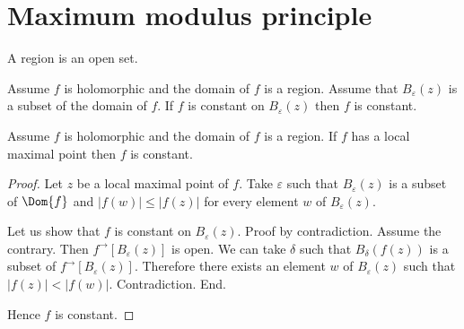 \documentclass{article}
\newcommand{\Ball}[2]{B_{#1}(#2)}
\newcommand{\image}[2]{#1^{\to}[#2]}
\begin{document}
    \section{Maximum modulus principle}

  \begin{forthel}
    \begin{signature}
      A region is an open set.
    \end{signature}

    \begin{axiom}
      Assume $f$ is holomorphic and the domain of $f$ is a region.
      Assume that $\Ball{\varepsilon}{z}$ is a subset of the domain of $f$.
      If $f$ is constant on $\Ball{\varepsilon}{z}$ then $f$ is constant.
    \end{axiom}

    \begin{proposition}
      Assume $f$ is holomorphic and the domain of $f$ is a region.
      If $f$ has a local maximal point then $f$ is constant.
    \end{proposition}
    \begin{proof}
      Let $z$ be a local maximal point of $f$.
      Take $\varepsilon$ such that
        $\Ball{\varepsilon}{z}$ is a subset of $\Dom{f}$
        and $|f(w)| \leq |f(z)|$ for every element $w$ of $\Ball{\varepsilon}{z}$.

      Let us show that $f$ is constant on $\Ball{\varepsilon}{z}$.
      Proof by contradiction.
        Assume the contrary.
        Then $\image{f}{\Ball{\varepsilon}{z}}$ is open.
        We can take $\delta$ such that
          $\Ball{\delta}{f(z)}$ is a subset of $\image{f}{\Ball{\varepsilon}{z}}$.
        Therefore there exists an element $w$ of $\Ball{\varepsilon}{z}$ such that
          $|f(z)| < |f(w)|$. Contradiction.
    	End.

      Hence $f$ is constant.
    \end{proof}
  \end{forthel}
\end{document}
